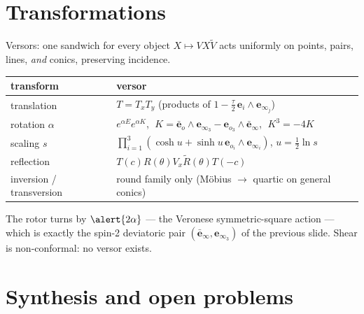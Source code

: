 \documentclass[aspectratio=169, 10pt]{beamer}
\newcommand{\eob}{\bar{\mathbf{e}}_o}
\newcommand{\einfb}{\bar{\mathbf{e}}_\infty}
\newcommand{\eoi}[1]{\mathbf{e}_{o_{#1}}}
\newcommand{\einfi}[1]{\mathbf{e}_{\infty_{#1}}}
\newcommand{\wed}{\wedge}
\begin{document}
\section{Transformations}

\begin{frame}[t]{Versors: one sandwich for every object}
  $X\mapsto V X \widetilde V$ acts uniformly on points, pairs, lines, \emph{and} conics,
  preserving incidence.
  \vspace{0.2cm}
  \begin{center}
  \renewcommand{\arraystretch}{1.35}
  \small
  \begin{tabular}{l l}
    transform & versor\\
    \hline
    translation & $T=T_x T_y$ (products of $1-\tfrac\tau2\,\mathbf{e}_i\wed\einfi{j}$)\\
    \alert{rotation} $\alpha$ & $e^{\alpha E}e^{\alpha K}$, $\;K=\eob\wed\einfi3-\eoi3\wed\einfb$, $\;K^3=-4K$\\
    scaling $s$ & $\prod_{i=1}^3(\cosh u+\sinh u\,\eoi{i}\wed\einfi{i})$, $u=\tfrac12\ln s$\\
    reflection & $T(c)R(\theta)V_x\widetilde R(\theta)T(-c)$\\
    inversion / transversion & \alert{round family only} (M\"obius $\to$ quartic on general conics)\\
  \end{tabular}
  \end{center}
  \vspace{0.2cm}
  The rotor turns by $\alert{2\alpha}$ --- the \alert{Veronese symmetric-square} action --- which is
  exactly the spin-2 deviatoric pair $(\einfb,\einfi3)$ of the previous slide.
  Shear is non-conformal: \alert{no versor exists}.
\end{frame}

\section{Synthesis and open problems}
\end{document}
